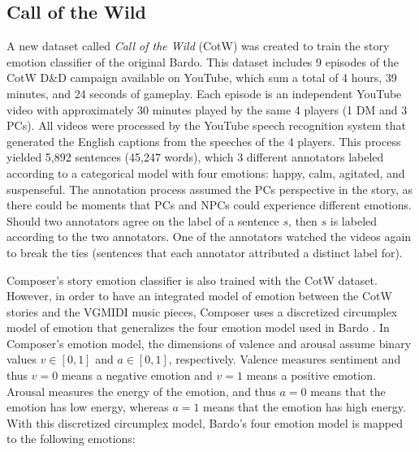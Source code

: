 \subsection{Call of the Wild}

A new dataset called \textit{Call of the Wild} (CotW) was created to train the story emotion classifier of the original Bardo. This dataset includes 9 episodes of the CotW D\&D campaign available on YouTube, which sum a total of 4 hours, 39 minutes, and 24 seconds of gameplay. Each episode is an independent YouTube video with approximately 30 minutes played by the same 4 players (1 DM and 3 PCs). All videos were processed by the YouTube speech recognition system that generated the English captions from the speeches of the 4 players. This process yielded 5,892 sentences (45,247 words), which 3 different annotators labeled according to a categorical model with four emotions: happy, calm, agitated, and suspenseful. The annotation process assumed the PCs perspective in the story, as there could be moments that PCs and NPCs could experience different emotions. Should two annotators agree on the label of a sentence $s$, then $s$ is labeled according to the two annotators. One of the annotators watched the videos again to break the ties (sentences that each annotator attributed a distinct label for).

Composer's story emotion classifier is also trained with the CotW dataset. However, in order to have an integrated model of emotion between the CotW stories and the VGMIDI music pieces, Composer uses a discretized circumplex model of emotion \cite{russell1980circumplex} that generalizes the four emotion model used in Bardo \cite{padovani2017}. In Composer's emotion model, the dimensions of valence and arousal assume binary values $v \in [0, 1]$ and $a \in [0, 1]$, respectively. Valence measures sentiment and thus $v = 0$ means a negative emotion and $v = 1$ means a positive emotion. Arousal measures the energy of the emotion, and thus $a = 0$ means that the emotion has low energy, whereas $a = 1$ means that the emotion has high energy. With this discretized circumplex model, Bardo's four emotion model is mapped to the following emotions:


